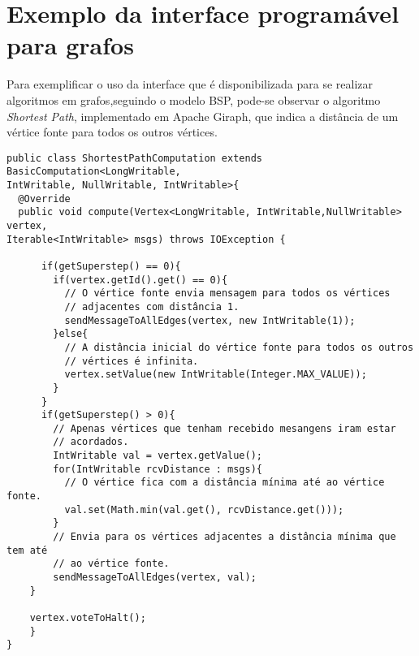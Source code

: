 \section{Exemplo da interface programável para grafos}

Para exemplificar o uso da interface que é disponibilizada para se 
realizar algoritmos em grafos,seguindo o modelo BSP, pode-se observar o 
algoritmo \textit{Shortest Path}, implementado em Apache Giraph, que indica a 
distância de um vértice fonte para todos os outros vértices.
\newpage
\begin{verbatim}
public class ShortestPathComputation extends BasicComputation<LongWritable, 
IntWritable, NullWritable, IntWritable>{
  @Override
  public void compute(Vertex<LongWritable, IntWritable,NullWritable> vertex, 
Iterable<IntWritable> msgs) throws IOException {
	
	  if(getSuperstep() == 0){
	    if(vertex.getId().get() == 0){
	      // O vértice fonte envia mensagem para todos os vértices 
	      // adjacentes com distância 1.
	      sendMessageToAllEdges(vertex, new IntWritable(1));
	    }else{
	      // A distância inicial do vértice fonte para todos os outros 
	      // vértices é infinita.
	      vertex.setValue(new IntWritable(Integer.MAX_VALUE));
	    }
	  }
	  if(getSuperstep() > 0){
	    // Apenas vértices que tenham recebido mesangens iram estar 
	    // acordados.
	    IntWritable val = vertex.getValue();		
	    for(IntWritable rcvDistance : msgs){
	      // O vértice fica com a distância mínima até ao vértice fonte.
	      val.set(Math.min(val.get(), rcvDistance.get()));
	    }
	    // Envia para os vértices adjacentes a distância mínima que tem até 
	    // ao vértice fonte.
	    sendMessageToAllEdges(vertex, val);		
	} 
	
	vertex.voteToHalt();
    }
}
\end{verbatim}


